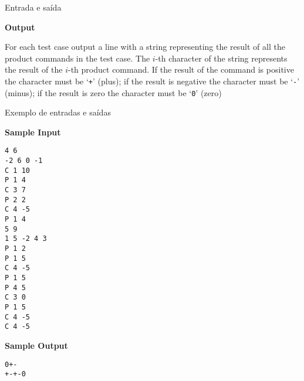 \begin{frame}[fragile]{Entrada e saída}

\textbf{Output}

For each test case output a line with a string representing the result of all the product commands 
in the test case. The $i$-th character of the string represents the result of the $i$-th product 
command. If the result of the command is positive the character must be ‘\texttt{+}’ (plus); if 
the result is negative the character must be ‘\texttt{-}’ (minus); if the result is zero the 
character must be ‘\texttt{0}’ (zero)

\end{frame}


\begin{frame}[fragile]{Exemplo de entradas e saídas}

\begin{scriptsize}
\begin{minipage}[t]{0.6\textwidth}
\textbf{Sample Input}
\begin{verbatim}
4 6
-2 6 0 -1
C 1 10
P 1 4
C 3 7
P 2 2
C 4 -5
P 1 4
5 9
1 5 -2 4 3
P 1 2
P 1 5
C 4 -5
P 1 5
P 4 5
C 3 0
P 1 5
C 4 -5
C 4 -5
\end{verbatim}
\end{minipage}
\begin{minipage}[t]{0.35\textwidth}
\textbf{Sample Output}
\begin{verbatim}
0+-
+-+-0
\end{verbatim}
\end{minipage}
\end{scriptsize}

\end{frame}

